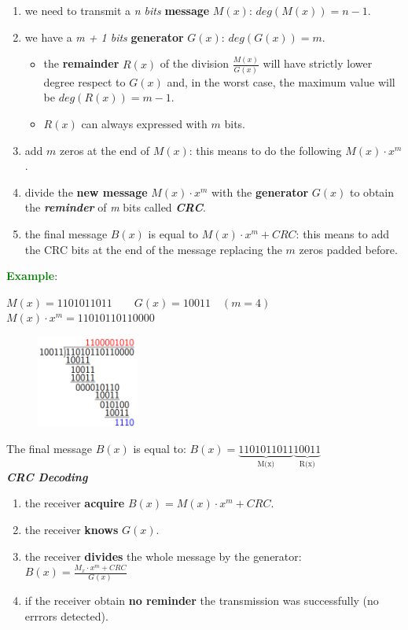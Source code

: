 \begin{enumerate}[nosep]
    \item we need to transmit a \textit{n bits} \textbf{message} $M(x)$: $deg(M(x)) = n - 1$.
    \item we have a \textit{m + 1 bits} \textbf{generator} $G(x)$: $deg(G(x)) = m$.
    \begin{itemize}[nosep]
        \item the \textbf{remainder} $R(x)$ of the division $\frac{M(x)}{G(x)}$ will have strictly lower degree respect to $G(x)$ and, in the worst case, the maximum value will be $deg(R(x)) = m - 1$.
        \item $R(x)$ can always expressed with $m$ bits.
    \end{itemize}
    \item add $m$ zeros at the end of $M(x)$: this means to do the following $M(x) \cdot x^m$.
    \item divide the \textbf{new message} $M(x) \cdot x^m$ with the \textbf{generator} $G(x)$ to obtain the \textbf{\textit{reminder}} of \textit{m} bits called \textbf{\textit{CRC}}.
    \item the final message $B(x)$ is equal to $M(x) \cdot x^m + CRC$: this means to add the CRC bits at the end of the message replacing the $m$ zeros padded before.
\end{enumerate}
\textcolor{green}{\textbf{Example}}:
\begin{center}
    $M(x) = 1101011011 \qquad G(x) = 10011 \quad (m = 4)$ \\
    $M(x) \cdot x^m = 11010110110000$
\end{center}
\begin{figure}[h]
    \centering
    \includegraphics[width=0.3\textwidth]{img/crc_cal}
\end{figure}
The final message $B(x)$ is equal to: $B(x) = \underbrace{1101011011}_\text{M(x)}\underbrace{10011}_\text{R(x)}$ \\ \newline
\textbf{\textit{CRC Decoding}}
\begin{enumerate}[nosep]
    \item the receiver \textbf{acquire} $B(x) = M(x) \cdot x^m + CRC$.
    \item the receiver \textbf{knows} $G(x)$.
    \item the receiver \textbf{divides} the whole message by the generator: $B(x) = \frac{M_x \cdot x^m + CRC}{G(x)}$ 
    \item if the receiver obtain \textbf{no reminder} the transmission was successfully (no errrors detected).
\end{enumerate}
